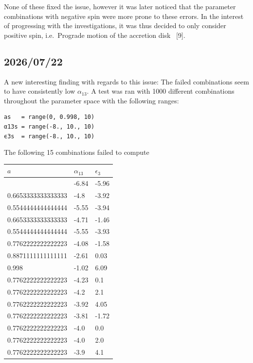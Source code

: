 \documentclass[
  letterpaper,
  DIV=11,
  numbers=noendperiod]{scrreprt}
\newcounter{none} %
\begin{document}
None of these fixed the issue, however it was later noticed that the
parameter combinations with negative spin were more prone to these
errors. In the interest of progressing with the investigations, it was
thus decided to only consider positive spin, i.e.~Prograde motion of the
accretion disk ~{[}9{]}.

\subsection{2026/07/22}\label{section-2}

A new interesting finding with regards to this issue: The failed
combinations seem to have consistently low \(\alpha_{13}\). A test was
ran with 1000 different combinations throughout the parameter space with
the following ranges:

\begin{verbatim}
as   = range(0, 0.998, 10)
α13s = range(-8., 10., 10)
ϵ3s  = range(-8., 10., 10)
\end{verbatim}

The following 15 combinations failed to compute

{\def\LTcaptype{none} %
\begin{longtable}[]{@{}lll@{}}
\toprule\noalign{}
\(a\) & \(\alpha_{13}\) & \(\epsilon_{3}\) \\
\midrule\noalign{}
\endhead
\bottomrule\noalign{}
\endlastfoot
0.33266666666666667 & -6.84 & -5.96 \\
0.6653333333333333 & -4.8 & -3.92 \\
0.5544444444444444 & -5.55 & -3.94 \\
0.6653333333333333 & -4.71 & -1.46 \\
0.5544444444444444 & -5.55 & -3.93 \\
0.7762222222222223 & -4.08 & -1.58 \\
0.8871111111111111 & -2.61 & 0.03 \\
0.998 & -1.02 & 6.09 \\
0.7762222222222223 & -4.23 & 0.1 \\
0.7762222222222223 & -4.2 & 2.1 \\
0.7762222222222223 & -3.92 & 4.05 \\
0.7762222222222223 & -3.81 & -1.72 \\
0.7762222222222223 & -4.0 & 0.0 \\
0.7762222222222223 & -4.0 & 2.0 \\
0.7762222222222223 & -3.9 & 4.1 \\
\end{longtable}
}
\end{document}
